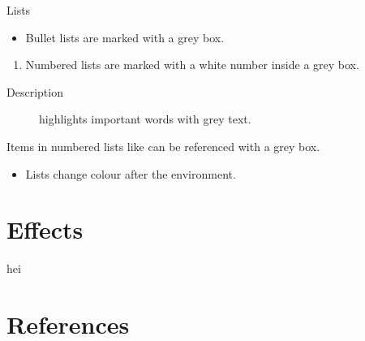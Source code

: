 \documentclass[UKenglish]{beamer}
\begin{document}
\begin{frame}{Lists}
    \begin{itemize}
        \item
        Bullet lists are marked with a grey box.
    \end{itemize}
    
    \begin{enumerate}
        \item
        \label{enum:item}
        Numbered lists are marked with a white number inside a grey box.
    \end{enumerate}

    \begin{description}
        \item[Description]
        highlights important words with grey text.
    \end{description}

    Items in numbered lists like  can be referenced with a grey box.

    \begin{example}
        \begin{itemize}
            \item
            Lists change colour after the environment.
        \end{itemize}
    \end{example}
\end{frame}


\section{Effects}
hei 

\section{References}
\end{document}
